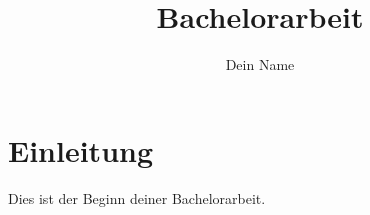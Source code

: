 \documentclass{article}
\title{Bachelorarbeit}
\author{Dein Name}
\begin{document}
\maketitle

\section{Einleitung}
Dies ist der Beginn deiner Bachelorarbeit.
\end{document}
